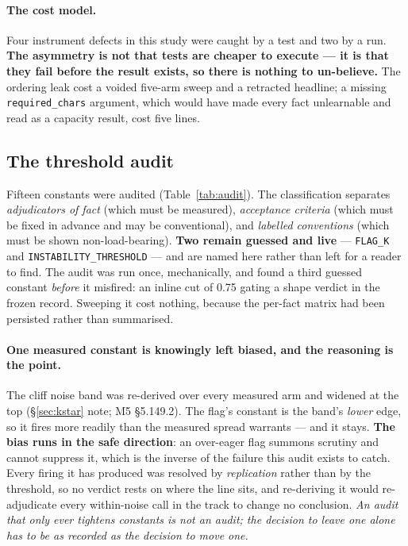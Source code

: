 \paragraph{The cost model.} Four instrument defects in this study were caught by a test and two by a
run. \textbf{The asymmetry is not that tests are cheaper to execute --- it is that they fail before
the result exists, so there is nothing to un-believe.} The ordering leak cost a voided five-arm
sweep and a retracted headline; a missing \texttt{required\_chars} argument, which would have made
every fact unlearnable and read as a capacity result, cost five lines.

\subsection{The threshold audit}

\begin{table}[t]\centering\small
\caption{Every numeric constant in an adjudication path, classified by provenance: what measurement
set it, if any.}
\label{tab:audit}

\end{table}

Fifteen constants were audited (Table~\ref{tab:audit}). The classification separates
\emph{adjudicators of fact} (which must be measured), \emph{acceptance criteria} (which must be
fixed in advance and may be conventional), and \emph{labelled conventions} (which must be shown
non-load-bearing). \textbf{Two remain guessed and live} --- \texttt{FLAG\_K} and
\texttt{INSTABILITY\_THRESHOLD} --- and are named here rather than left for a reader to find. The
audit was run once, mechanically, and found a third guessed constant \emph{before} it misfired: an
inline cut of 0.75 gating a shape verdict in the frozen record. Sweeping it cost nothing, because
the per-fact matrix had been persisted rather than summarised.

\paragraph{One measured constant is knowingly left biased, and the reasoning is the point.} The
cliff noise band was re-derived over every measured arm and widened at the top (\S\ref{sec:kstar}
note; M5 \S5.149.2). The flag's constant is the band's \emph{lower} edge, so it fires more readily
than the measured spread warrants --- and it stays. \textbf{The bias runs in the safe direction}: an
over-eager flag summons scrutiny and cannot suppress it, which is the inverse of the failure this
audit exists to catch. Every firing it has produced was resolved by \emph{replication} rather than
by the threshold, so no verdict rests on where the line sits, and re-deriving it would re-adjudicate
every within-noise call in the track to change no conclusion. \emph{An audit that only ever tightens
constants is not an audit; the decision to leave one alone has to be as recorded as the decision to
move one.}

